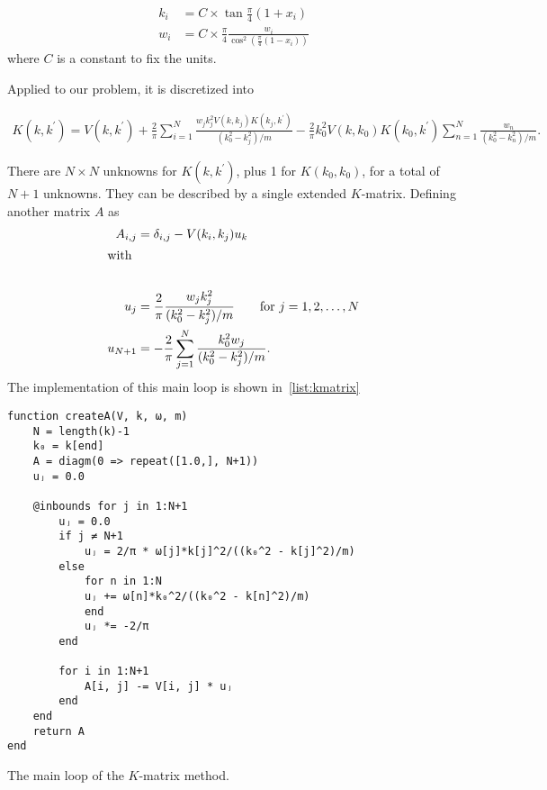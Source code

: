 \begin{align*}
  k_{i} &= C\times \tan{\frac{\pi}{4}(1+x_{i})}\\
  w_{i} &= C\times \frac{\pi}{4}\frac{w_{i}}{\cos^{2}\left( \frac{\pi}{4}(1-x_{i}) \right)}
\end{align*}
where \(C\) is a constant to fix the units.

Applied to our problem, it is discretized into

\begin{align*}
  K(k, k^{\prime}) = V(k, k^{\prime}) + \frac{2}{\pi}\sum_{i=1}^{N}
  \frac{w_{j}k_{j}^{2}V(k, k_{j})K(k_{j},k^{\prime})}{(k_{0}^{2}-k_{j}^{2})/m}
  - \frac{2}{\pi}k_{0}^{2}V(k, k_{0})K(k_{0},k^{\prime})\sum_{n=1}^{N}
  \frac{w_{n}}{(k_{0}^{2}-k_{n}^{2})/m}.
\end{align*}

There are \(N\times N\) unknowns for \(K(k, k^{\prime})\), plus 1 for \(K(k_{0},
k_{0})\), for a total of \(N+1\) unknowns. They can be described by a single
extended \(K\)-matrix. Defining another matrix \(A\) as
\begin{align*}
  A_{i,j} &= \delta_{i,j} - V(k_{i}, k_{j})u_{k}\\
  \intertext{with}\\
            u_{j} &= \frac{2}{\pi} \frac{w_{j}k_{j}^{2}}{(k_{0}^{2}-k_{j}^{2})/m}
                    \qquad \text{for } j = 1, 2, \ldots, N \\
  u_{N+1} &= - \frac{2}{\pi}\sum_{j=1}^{N}\frac{k_{0}^{2}w_{j}}{(k_{0}^{2}-k_{j}^{2})/m}.
\end{align*}
The implementation of this main loop is shown in~\cref{list:kmatrix}

\begin{listing}
\begin{verbatim}
function createA(V, k, ω, m)
    N = length(k)-1
    k₀ = k[end]
    A = diagm(0 => repeat([1.0,], N+1))
    uⱼ = 0.0

    @inbounds for j in 1:N+1
        uⱼ = 0.0
        if j ≠ N+1
            uⱼ = 2/π * ω[j]*k[j]^2/((k₀^2 - k[j]^2)/m)
        else
            for n in 1:N
            uⱼ += ω[n]*k₀^2/((k₀^2 - k[n]^2)/m)
            end
            uⱼ *= -2/π
        end

        for i in 1:N+1
            A[i, j] -= V[i, j] * uⱼ
        end
    end
    return A
end
\end{verbatim}
\label{list:kmatrix}
\caption{The main loop of the \(K\)-matrix method.}
\end{listing}

